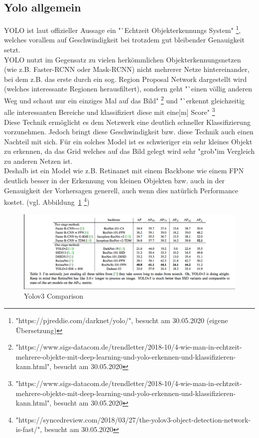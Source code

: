 \documentclass[a4paper,oneside,12pt]{report}
\begin{document}
\begin{onehalfspace}
		\subsection{Yolo allgemein}
		YOLO ist laut offizieller Aussage ein "`Echtzeit Objekterkennungs System"
		\footnote{"https://pjreddie.com/darknet/yolo/", besucht am 30.05.2020 (eigene Übersetzung)},
		welches vorallem auf Geschwindigkeit bei trotzdem gut bleibender Genauigkeit setzt.\\
		YOLO nutzt im Gegensatz zu vielen herkömmlichen Objekterkennungsnetzen (wie z.B. Faster-RCNN oder Mask-RCNN) nicht mehrerer Netze hintereinander, bei dem z.B. das erste durch ein sog. Region Proposal Network dargestellt wird (welches interessante Regionen herausfiltert), sondern geht "`einen völlig anderen Weg und schaut nur ein einziges Mal auf das Bild"
		\footnote{"https://www.sigs-datacom.de/trendletter/2018-10/4-wie-man-in-echtzeit-mehrere-objekte-mit-deep-learning-und-yolo-erkennen-und-klassifizieren-kann.html", besucht am 30.05.2020}
		und "`erkennt gleichzeitig alle interessanten Bereiche und klassifiziert diese mit eine[m] Score"
		\footnote{"https://www.sigs-datacom.de/trendletter/2018-10/4-wie-man-in-echtzeit-mehrere-objekte-mit-deep-learning-und-yolo-erkennen-und-klassifizieren-kann.html", besucht am 30.05.2020}\\
		Diese Technik ermöglicht es dem Netzwerk eine deutlich schneller Klassifizierung vorzunehmen. \clearpage
		Jedoch bringt diese Geschwindigkeit bzw. diese Technik auch einen Nachteil mit sich. Für ein solches Model ist es schwieriger ein sehr kleines Objekt zu erkennen, da das Grid welches auf das Bild gelegt wird sehr "grob"\space im Vergleich zu anderen Netzen ist. \\
		Deshalb ist ein Model wie z.B. Retinanet mit einem Backbone wie einem FPN deutlich besser in der Erkennung von kleinen Objekten bzw. auch in der Genauigkeit der Vorhersagen generell, auch wenn dies natürlich Performance kostet. (vgl. Abbildung~\ref{fig:comparison}
		\footnote{"https://syncedreview.com/2018/03/27/the-yolov3-object-detection-network-is-fast/", besucht am 30.05.2020})\\
		\begin{figure}[h!]
			\includegraphics[width=\linewidth]{Comparison.png}
			\caption{Yolov3 Comparison}
			\label{fig:comparison}
		\end{figure}

\end{onehalfspace}
\end{document}
